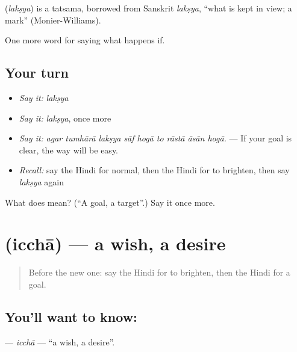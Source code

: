 \begin{cousinweb}
\textbf{} (\emph{lakṣya}) is a tatsama, borrowed from Sanskrit \emph{lakṣya}, \textquotedblleft{}what is kept in view; a mark\textquotedblright{} (Monier-Williams).
\end{cousinweb}

\begin{grammarlens}[title={What you've built}]
One more word for saying what happens if.
\end{grammarlens}

\subsection*{Your turn}
\begin{itemize}
\raggedright
  \item \emph{Say it:} \emph{lakṣya}
  \item \emph{Say it:} \emph{lakṣya}, once more
  \item \emph{Say it:} \emph{agar tumhārā lakṣya sāf hogā to rāstā āsān hogā.} — If your goal is clear, the way will be easy.
  \item \emph{Recall:} say the Hindi for normal, then the Hindi for to brighten, then say \emph{lakṣya} again
\end{itemize}

\begin{tcolorbox}[breakable,colback=teal!4,colframe=teal!35!black,title={Before you move on}]
What does  mean? (\textquotedblleft{}A goal, a target\textquotedblright{}.) Say it once more.
\end{tcolorbox}
\section[\texorpdfstring{\hi{इच्छा} (icchā)}{इच्छा (icchā)}]{ (icchā) — a wish, a desire}

\label{lesson:HI-C390-iccha}



\begin{quote}
Before the new one: say the Hindi for to brighten, then the Hindi for a goal.
\end{quote}

\subsection*{You'll want to know: }
\textbf{} — \emph{icchā} — \textquotedblleft{}a wish, a desire\textquotedblright{}.

